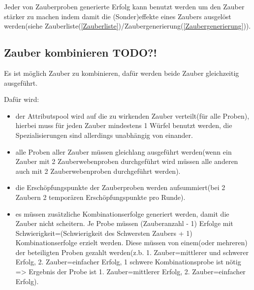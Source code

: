Jeder von Zauberproben generierte Erfolg kann benutzt werden um den Zauber stärker zu machen indem damit die (Sonder)effekte eines Zaubers ausgelöst werden(siehe Zauberliste(\ref{Zauberliste})/Zaubergenerierung(\ref{Zaubergenerierung})).

\subsection{Zauber kombinieren TODO?!}
Es ist möglich Zauber zu kombinieren, dafür werden beide Zauber gleichzeitig ausgeführt.

Dafür wird:\begin{itemize}
\item der Attributspool wird auf die zu wirkenden Zauber verteilt(für alle Proben), hierbei muss für jeden Zauber mindestens 1 Würfel benutzt werden, die Spezialisierungen sind allerdings unabhängig von einander.
\item alle Proben aller Zauber müssen gleichlang ausgeführt werden(wenn ein Zauber mit 2 Zauberwebenproben durchgeführt wird müssen alle anderen auch mit 2 Zauberwebenproben durchgeführt werden).
\item die Erschöpfungspunkte der Zauberproben werden aufsummiert(bei 2 Zaubern 2 temporären Erschöpfungspunkte pro Runde).
\item es müssen zusätzliche Kombinationserfolge generiert werden, damit die Zauber nicht scheitern.
Je Probe müssen (Zauberanzahl - 1) Erfolge mit Schwierigkeit=(Schwierigkeit des Schwersten Zaubers + 1) Kombinationserfolge erzielt werden.
Diese müssen von einem(oder mehreren) der beteiligten Proben gezahlt werden(z.b. 1. Zauber=mittlerer und schwerer Erfolg, 2. Zauber=einfacher Erfolg, 1 schwere Kombinationsprobe ist nötig => Ergebnis der Probe ist 1. Zauber=mittlerer Erfolg, 2. Zauber=einfacher Erfolg).
\end{itemize}
